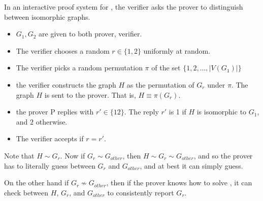 In an interactive proof system for \gni, the verifier asks the prover to
distinguish between isomorphic graphs.

\begin{itemize}
\item $G_1, G_2$ are given to both prover, verifier.

\item The verifier chooses a random  $r \in \{1, 2\}$ uniformly at random.

\item The verifier picks a random permutation $\pi$ of the set $\{1, 2,\dots, |V(G_1)|\}$

\item the verifier constructs the graph $H$ as the permutation of $G_r$ under $\pi$.
The graph $H$ is sent to the prover. That is, $H \equiv \pi(G_r)$.

\item the prover P replies with $r' \in \{1 2\}$. The reply $r'$ is 1
if $H$ is isomorphic to $G_1$, and $2$ otherwise.

\item The verifier accepts if $r = r'$.
\end{itemize}

Note that $H \sim G_r$. Now if $G_r \sim G_{other}$, then $H \sim G_r \sim G_{other}$, and
so the prover has to literally guess between $G_r$ and $G_{other}$, and at best
it can simply guess.

On the other hand if $G_r \nsim G_{other}$, then if the prover knows how to solve
\gni , it can check between $H$, $G_r$, and $G_{other}$ to consistently
report $G_r$.



